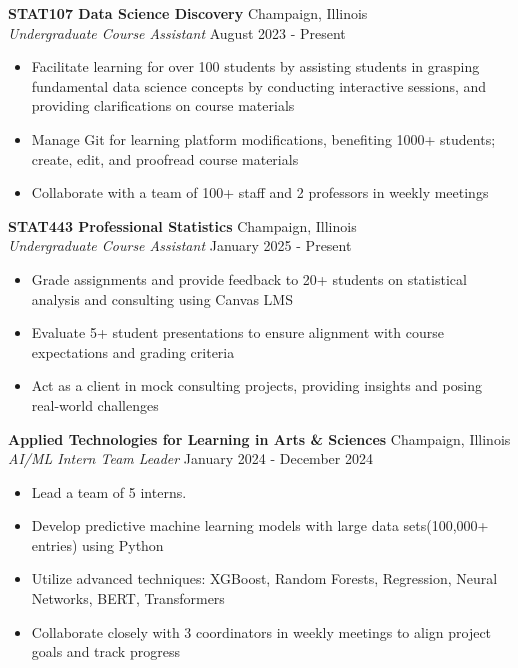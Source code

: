 \documentclass[a4paper]{article}
\begin{document}
\textbf{STAT107 Data Science Discovery} 
\hfill Champaign, Illinois\\
\textit{Undergraduate Course Assistant} \hfill August 2023 - Present\\
    \begin{itemize}[noitemsep]
    \item Facilitate learning for over 100 students by assisting 
    students in grasping fundamental
    data science concepts by conducting interactive sessions,
    and providing clarifications on course materials
    \item Manage Git for learning platform modifications, 
    benefiting 1000+ students; create, edit, and proofread course materials
    \item Collaborate with a team of 100+ staff and 2 professors in weekly meetings 
    \end{itemize}

\vspace{1mm}

\textbf{STAT443 Professional Statistics} 
\hfill Champaign, Illinois\\
\textit{Undergraduate Course Assistant} \hfill January 2025 - Present\\
    \begin{itemize}[noitemsep]
        \item Grade assignments and provide feedback to 20+ students on statistical analysis and consulting using Canvas LMS
        \item Evaluate 5+ student presentations to ensure alignment with course expectations and grading criteria
        \item Act as a client in mock consulting projects, providing insights and posing real-world challenges
    \end{itemize}
    
\vspace{1mm}

\vspace{1mm}

\textbf{Applied Technologies for Learning in Arts \& Sciences}
\hfill Champaign, Illinois\\
\textit{AI/ML Intern Team Leader} \hfill January 2024 - December 2024\\

    \begin{itemize}[noitemsep]
        \item Lead a team of 5 interns. 
        \item Develop predictive machine learning models with large data sets(100,000+ entries) using Python
        \item Utilize advanced techniques: XGBoost, Random Forests, Regression, Neural Networks, BERT, Transformers
        \item Collaborate closely with 3 coordinators in weekly meetings to align project goals and track progress
    \end{itemize}
\end{document}

